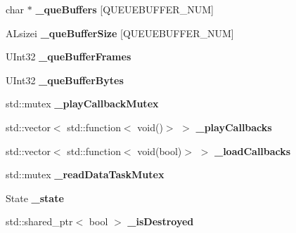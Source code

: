 \begin{DoxyCompactItemize}
char $\ast$ {\bfseries \+\_\+que\+Buffers} \mbox{[}Q\+U\+E\+U\+E\+B\+U\+F\+F\+E\+R\+\_\+\+N\+UM\mbox{]}
\item 
\mbox{\label{classexperimental_1_1AudioCache_ad775c8917c63c3e6679fd2d91541f171}} 
A\+Lsizei {\bfseries \+\_\+que\+Buffer\+Size} \mbox{[}Q\+U\+E\+U\+E\+B\+U\+F\+F\+E\+R\+\_\+\+N\+UM\mbox{]}
\item 
\mbox{\label{classexperimental_1_1AudioCache_a5af478e1d5393ef1dec907c1ddade25a}} 
U\+Int32 {\bfseries \+\_\+que\+Buffer\+Frames}
\item 
\mbox{\label{classexperimental_1_1AudioCache_a00db8ea59d4a88230b0ebb9d7fc2b6e6}} 
U\+Int32 {\bfseries \+\_\+que\+Buffer\+Bytes}
\item 
\mbox{\label{classexperimental_1_1AudioCache_a427902bc9251474c4fe1c4ec4ca571b7}} 
std\+::mutex {\bfseries \+\_\+play\+Callback\+Mutex}
\item 
\mbox{\label{classexperimental_1_1AudioCache_a88f2fa69478fe802d7eb501e2d10962a}} 
std\+::vector$<$ std\+::function$<$ void()$>$ $>$ {\bfseries \+\_\+play\+Callbacks}
\item 
\mbox{\label{classexperimental_1_1AudioCache_a0a398a309a66ba536c452c8dce8c464a}} 
std\+::vector$<$ std\+::function$<$ void(bool)$>$ $>$ {\bfseries \+\_\+load\+Callbacks}
\item 
\mbox{\label{classexperimental_1_1AudioCache_af21bf0eeb360b1c5be52df83e0e342a4}} 
std\+::mutex {\bfseries \+\_\+read\+Data\+Task\+Mutex}
\item 
\mbox{\label{classexperimental_1_1AudioCache_a89ba776ea5abaa6f56f648adf058b0b3}} 
State {\bfseries \+\_\+state}
\item 
\mbox{\label{classexperimental_1_1AudioCache_adb2f9f991fcae4bd3f54b0c31397ce2b}} 
std\+::shared\+\_\+ptr$<$ bool $>$ {\bfseries \+\_\+is\+Destroyed}
\item 

\end{DoxyCompactItemize}

